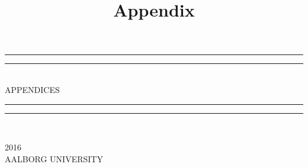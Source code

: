 \documentclass{article}
\begin{document}
\title{Appendix}

\newlength{\drop}

		\textheight
		\centering
		\vspace*{\baselineskip}
		\rule{\textwidth}{1.6pt}\vspace*{-\baselineskip}\vspace*{2pt}
		\rule{\textwidth}{0.4pt}\\[\baselineskip]
		{\LARGE APPENDICES}\\[0.2\baselineskip]
		\rule{\textwidth}{0.4pt}\vspace*{-\baselineskip}\vspace{3.2pt}
		\rule{\textwidth}{1.6pt}\\[\baselineskip]
		\scshape
		\vspace*{2\baselineskip}
		\vspace*{2\baselineskip}
		\vspace*{2\baselineskip}
		\vspace*{2\baselineskip}

\tableofcontents




\vspace*{2\baselineskip}
	\vspace*{2\baselineskip}
	\vspace*{2\baselineskip}
	\vspace*{2\baselineskip}
		{\scshape 2016} \\
		{\large AALBORG UNIVERSITY}\par
		





\end{document}
